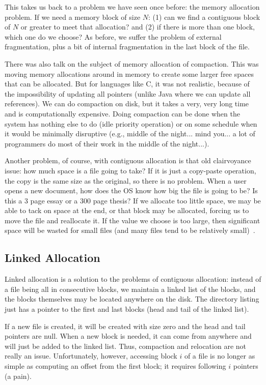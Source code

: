 This takes us back to a problem we have seen once before: the memory allocation problem. If we need a memory block of size $N$: (1) can we find a contiguous block of $N$ or greater to meet that allocation? and (2) if there is more than one block, which one do we choose? As before, we suffer the problem of external fragmentation, plus a bit of internal fragmentation in the last block of the file. 

There was also talk on the subject of memory allocation of compaction. This was moving memory allocations around in memory to create some larger free spaces that can be allocated. But for languages like C, it was not realistic, because of the impossibility of updating all pointers (unlike Java where we can update all references). We can do compaction on disk, but it takes a very, very long time and is computationally expensive. Doing compaction can be done when the system has nothing else to do (idle priority operation) or on some schedule when it would be minimally disruptive (e.g., middle of the night... mind you... a lot of programmers do most of their work in the middle of the night...).

Another problem, of course, with contiguous allocation is that old clairvoyance issue: how much space is a file going to take? If it is just a copy-paste operation, the copy is the same size as the original, so there is no problem. When a user opens a new document, how does the OS know how big the file is going to be? Is this a 3 page essay or a 300 page thesis? If we allocate too little space, we may be able to tack on space at the end, or that block may be allocated, forcing us to move the file and reallocate it. If the value we choose is too large, then significant space will be wasted for small files (and many files tend to be relatively small)~\cite{osc}. 

\subsection*{Linked Allocation}
Linked allocation is a solution to the problems of contiguous allocation: instead of a file being all in consecutive blocks, we maintain a linked list of the blocks, and the blocks themselves may be located anywhere on the disk. The directory listing just has a pointer to the first and last blocks (head and tail of the linked list).

If a new file is created, it will be created with size zero and the head and tail pointers are null. When a new block is needed, it can come from anywhere and will just be added to the linked list. Thus, compaction and relocation are not really an issue. Unfortunately, however, accessing block $i$ of a file is no longer as simple as computing an offset from the first block; it requires following $i$ pointers (a pain).

